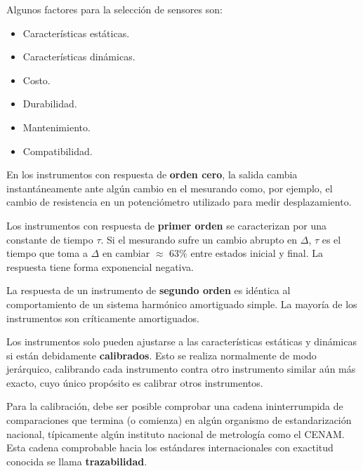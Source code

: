 \documentclass[12pt, letterpaper]{extarticle}
\begin{document}




Algunos factores para la selección de sensores son:
\begin{itemize}
    \item Características estáticas.
    \item Características dinámicas.
    \item Costo.
    \item Durabilidad.
    \item Mantenimiento.
    \item Compatibilidad.
\end{itemize}


En los instrumentos con respuesta de \textbf{orden cero}, la salida cambia instantáneamente ante algún cambio en el mesurando como, por ejemplo, el cambio de resistencia en un potenciómetro utilizado para medir desplazamiento.

Los instrumentos con respuesta de \textbf{primer orden} se caracterizan por una constante de tiempo $\tau$. Si el mesurando sufre un cambio abrupto en $\Delta$, $\tau$ es el tiempo que toma a $\Delta$ en cambiar $\approx$ 63\% entre estados inicial y final. La respuesta tiene forma exponencial negativa.

La respuesta de un instrumento de \textbf{segundo orden} es idéntica al comportamiento de un sistema harmónico amortiguado simple. La mayoría de los instrumentos son críticamente amortiguados.


Los instrumentos solo pueden ajustarse a las características estáticas y dinámicas si están debidamente \textbf{calibrados}. Esto se realiza normalmente de modo jerárquico, calibrando cada instrumento contra otro instrumento similar aún más exacto, cuyo único propósito es calibrar otros instrumentos.

Para la calibración, debe ser posible comprobar una cadena ininterrumpida de comparaciones que termina (o comienza) en algún organismo de estandarización nacional, típicamente algún instituto nacional de metrología como el CENAM. Esta cadena comprobable hacia los estándares internacionales con exactitud conocida se llama \textbf{trazabilidad}.
\end{document}
